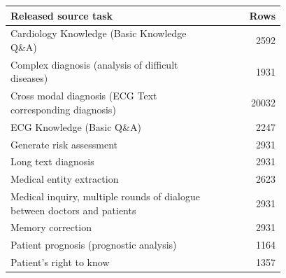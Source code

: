 \begin{tabular}{p{0.78\linewidth}r}
\toprule
Released source task & Rows \\
\midrule
Cardiology Knowledge (Basic Knowledge Q\&A) & 2592 \\
Complex diagnosis (analysis of difficult diseases) & 1931 \\
Cross modal diagnosis (ECG Text corresponding diagnosis) & 20032 \\
ECG Knowledge (Basic Q\&A) & 2247 \\
Generate risk assessment & 2931 \\
Long text diagnosis & 2931 \\
Medical entity extraction & 2623 \\
Medical inquiry, multiple rounds of dialogue between doctors and patients & 2931 \\
Memory correction & 2931 \\
Patient prognosis (prognostic analysis) & 1164 \\
Patient's right to know & 1357 \\
\bottomrule
\end{tabular}

